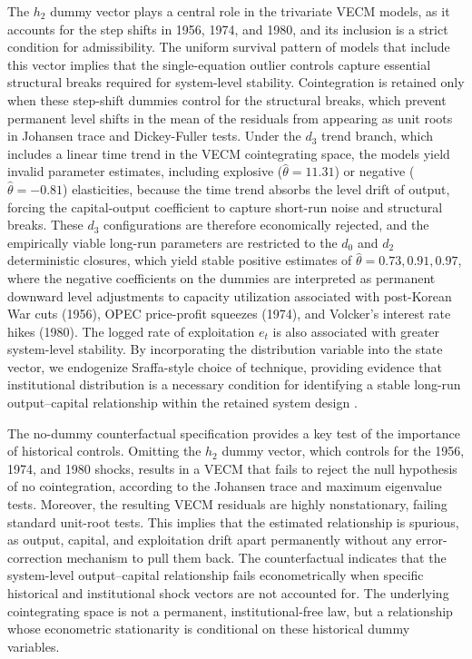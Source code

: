 \documentclass[11pt]{article}
\begin{document}
The $h_2$ dummy vector plays a central role in the trivariate VECM models, as it accounts for the step shifts in 1956, 1974, and 1980, and its inclusion is a strict condition for admissibility. The uniform survival pattern of models that include this vector implies that the single-equation outlier controls capture essential structural breaks required for system-level stability. Cointegration is retained only when these step-shift dummies control for the structural breaks, which prevent permanent level shifts in the mean of the residuals from appearing as unit roots in Johansen trace and Dickey-Fuller tests. Under the $d_3$ trend branch, which includes a linear time trend in the VECM cointegrating space, the models yield invalid parameter estimates, including explosive ($\hat{\theta} = 11.31$) or negative ($\hat{\theta} = -0.81$) elasticities, because the time trend absorbs the level drift of output, forcing the capital-output coefficient to capture short-run noise and structural breaks. These $d_3$ configurations are therefore economically rejected, and the empirically viable long-run parameters are restricted to the $d_0$ and $d_2$ deterministic closures, which yield stable positive estimates of $\hat{\theta} = 0.73, 0.91, 0.97$, where the negative coefficients on the dummies are interpreted as permanent downward level adjustments to capacity utilization associated with post-Korean War cuts (1956), OPEC price-profit squeezes (1974), and Volcker's interest rate hikes (1980). The logged rate of exploitation $e_t$ is also associated with greater system-level stability. By incorporating the distribution variable into the state vector, we endogenize Sraffa-style choice of technique, providing evidence that institutional distribution is a necessary condition for identifying a stable long-run output--capital relationship within the retained system design \citep{Kurz1986}.

The no-dummy counterfactual specification provides a key test of the importance of historical controls. Omitting the $h_2$ dummy vector, which controls for the 1956, 1974, and 1980 shocks, results in a VECM that fails to reject the null hypothesis of no cointegration, according to the Johansen trace and maximum eigenvalue tests. Moreover, the resulting VECM residuals are highly nonstationary, failing standard unit-root tests. This implies that the estimated relationship is spurious, as output, capital, and exploitation drift apart permanently without any error-correction mechanism to pull them back. The counterfactual indicates that the system-level output--capital relationship fails econometrically when specific historical and institutional shock vectors are not accounted for. The underlying cointegrating space is not a permanent, institutional-free law, but a relationship whose econometric stationarity is conditional on these historical dummy variables.
\end{document}
